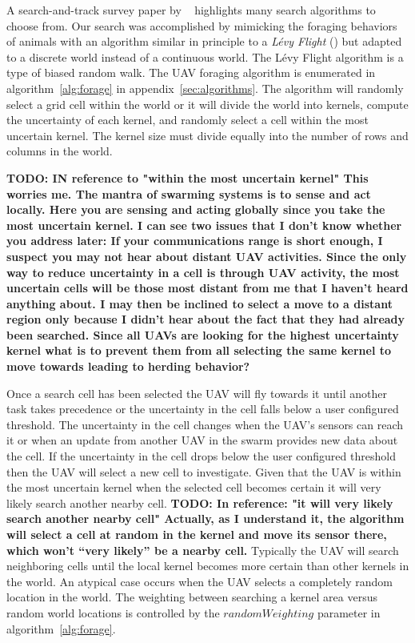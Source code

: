 A search-and-track survey paper by ~\cite{senanayake} highlights many search algorithms to choose from. Our search was accomplished by mimicking the foraging behaviors of animals with an algorithm similar in principle to a \textit{L\'evy Flight} (\cite{humphries}) but adapted to a discrete world instead of a continuous world.  The L\'evy Flight algorithm is a type of biased random walk.  The UAV foraging algorithm is enumerated in algorithm~\ref{alg:forage} in appendix~\ref{sec:algorithms}.  The algorithm will randomly select a grid cell within the world or it will divide the world into kernels, compute the uncertainty of each kernel, and randomly select a cell within the most uncertain kernel.  The kernel size must divide equally into the number of rows and columns in the world. 

\textbf{TODO: IN reference to "within the most uncertain kernel"
	This worries me. The mantra of swarming systems is to sense and act locally. Here you are sensing and acting globally since you take the most uncertain kernel. I can see two issues that I don’t know whether you address later:
	If your communications range is short enough, I suspect you may not hear about distant UAV activities. Since the only way to reduce uncertainty in a cell is through UAV activity, the most uncertain cells will be those most distant from me that I haven’t heard anything about. I may then be inclined to select a move to a distant region only because I didn’t hear about the fact that they had already been searched. 
	Since all UAVs are looking for the highest uncertainty kernel what is to prevent them from all selecting the same kernel to move towards leading to herding behavior? } 


Once a search cell has been selected the UAV will fly towards it until another task takes precedence or the uncertainty in the cell falls below a user configured threshold.  The uncertainty in the cell changes when the UAV's sensors can reach it or when an update from another UAV in the swarm provides new data about the cell. If the uncertainty in the cell drops below the user configured threshold then the UAV will select a new cell to investigate.  Given that the UAV is within the most uncertain kernel when the selected cell becomes certain it will very likely search another nearby cell. \textbf{TODO: In reference: "it will very likely search another nearby cell" Actually, as I understand it, the algorithm will select a cell at random in the kernel and move its sensor there, which won’t “very likely” be a nearby cell. }  Typically the UAV will search neighboring cells until the local kernel becomes more certain than other kernels in the world.  An atypical case occurs when the UAV selects a completely random location in the world.  The weighting between searching a kernel area versus random world locations is controlled by the $randomWeighting$ parameter in algorithm~\ref{alg:forage}.

